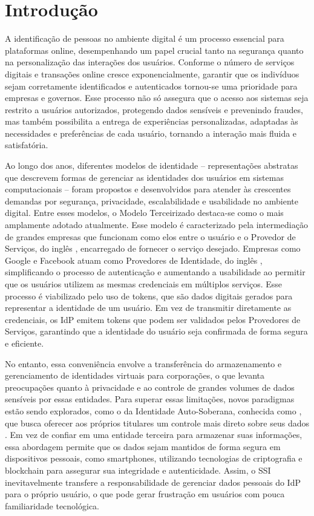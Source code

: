 \chapter{Introdução}\label{ch:intro}

A identificação de pessoas no ambiente digital é um processo essencial para plataformas online, desempenhando um papel crucial tanto na segurança quanto na personalização das interações dos usuários. Conforme o número de serviços digitais e transações online cresce exponencialmente, garantir que os indivíduos sejam corretamente identificados e autenticados tornou-se uma prioridade para empresas e governos. Esse processo não só assegura que o acesso aos sistemas seja restrito a usuários autorizados, protegendo dados sensíveis e prevenindo fraudes, mas também possibilita a entrega de experiências personalizadas, adaptadas às necessidades e preferências de cada usuário, tornando a interação mais fluida e satisfatória.

Ao longo dos anos, diferentes modelos de identidade – representações abstratas que descrevem formas de gerenciar as identidades dos usuários em sistemas computacionais \cite{ELJAOUHARI2017389} – foram propostos e desenvolvidos para atender às crescentes demandas por segurança, privacidade, escalabilidade e usabilidade no ambiente digital. Entre esses modelos, o Modelo Terceirizado destaca-se como o mais amplamente adotado atualmente. Esse modelo é caracterizado pela intermediação de grandes empresas que funcionam como elos entre o usuário e o Provedor de Serviços, do inglês , encarregado de fornecer o serviço desejado. Empresas como Google e Facebook atuam como Provedores de Identidade, do inglês , simplificando o processo de autenticação e aumentando a usabilidade ao permitir que os usuários utilizem as mesmas credenciais em múltiplos serviços. Esse processo é viabilizado pelo uso de tokens, que são dados digitais gerados para representar a identidade de um usuário. Em vez de transmitir diretamente as credenciais, os \acs{IdP} emitem tokens que podem ser validados pelos Provedores de Serviços, garantindo que a identidade do usuário seja confirmada de forma segura e eficiente.

No entanto, essa conveniência envolve a transferência do armazenamento e gerenciamento de identidades virtuais para corporações, o que levanta preocupações quanto à privacidade e ao controle de grandes volumes de dados sensíveis por essas entidades. Para superar essas limitações, novos paradigmas estão sendo explorados, como o da Identidade Auto-Soberana, conhecida como , que busca oferecer aos próprios titulares um controle mais direto sobre seus dados \cite{dock2024ssi}. Em vez de confiar em uma entidade terceira para armazenar suas informações, essa abordagem permite que os dados sejam mantidos de forma segura em dispositivos pessoais, como smartphones, utilizando tecnologias de criptografia e blockchain para assegurar sua integridade e autenticidade. Assim, o \acs{SSI} inevitavelmente transfere a responsabilidade de gerenciar dados pessoais do \acs{IdP} para o próprio usuário, o que pode gerar frustração em usuários com pouca familiaridade tecnológica.

